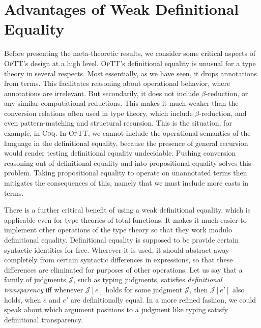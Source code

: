 \documentclass{fundam}
\newcommand{\optt}{\textsc{OpTT}}
\begin{document}
\section{Advantages of Weak Definitional Equality}
\label{sec:weak}

Before presenting the meta-theoretic results, we consider some
critical aspects of \optt's design at a high level.  \optt's
definitional equality is unusual for a type theory in several
respects.  Most essentially, as we have seen, it drops annotations
from terms.  This facilitates reasoning about operational behavior,
where annotations are irrelevant.  But secondarily, it does not
include $\beta$-reduction, or any similar computational reductions.
This makes it much weaker than the conversion relations often used in
type theory, which include $\beta$-reduction, and even
pattern-matching and structural recursion.  This is the situation, for
example, in \textsc{Coq}.  In \optt, we cannot include the operational
semantics of the language in the definitional equality, because the
presence of general recursion would render testing definitional
equality undecidable.  Pushing conversion reasoning out of
definitional equality and into propositional equality solves this
problem.  Taking propositional equality to operate on unannotated
terms then mitigates the consequences of this, namely that we must
include more casts in terms. 

There is a further critical benefit of using a weak definitional
equality, which is applicable even for type theories of total
functions.  It makes it much easier to implement other operations of
the type theory so that they work modulo definitional equality.
Definitional equality is supposed to be provide certain syntactic
identities for free.  Wherever it is used, it should abstract away
completely from certain syntactic differences in expressions, so that
these differences are eliminated for purposes of other operations.
Let us say that a family of judgments $\mathcal{J}$, such as typing
judgments, satisfies \emph{definitional transparency} iff whenever
$\mathcal{J}[e]$ holds for some judgment $\mathcal{J}$, then
$\mathcal{J}[e']$ also holds, when $e$ and $e'$ are definitionally
equal.  In a more refined fashion, we could speak about which argument
positions to a judgment like typing satisfy definitional transparency.
\end{document}

